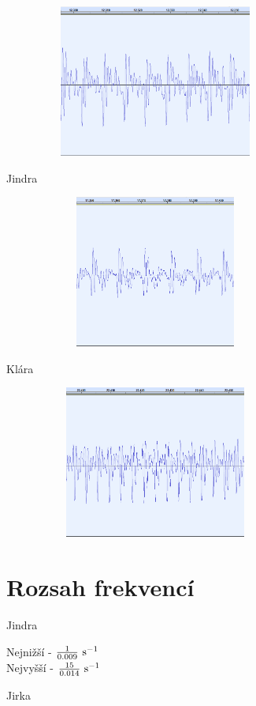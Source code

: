 \documentclass[12pt,a4paper]{article}
\begin{document}
\includegraphics[height=5cm,width=10cm]{aaa.png}

Jindra

\includegraphics[height=5cm,width=10cm]{aaaj.png}

Klára

\includegraphics[height=5cm,width=10cm]{aaak.png}

\newpage

\section{Rozsah frekvencí}

Jindra

\def\f{\frac}
Nejnižší - $\f{1}{0.009}\ {\rm s^{-1}}$\\
Nejvyšší - $\f{15}{0.014}\ {\rm s^{-1}}$

Jirka
\end{document}
